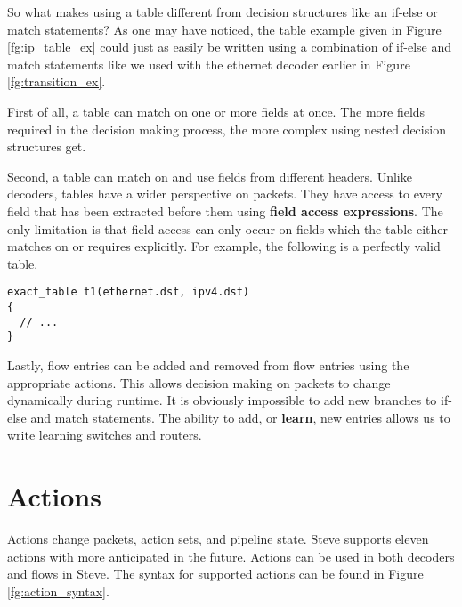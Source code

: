 So what makes using a table different from decision structures like an if-else or match statements? As one may have noticed, the table example given in Figure \ref{fg:ip_table_ex} could just as easily be written using a combination of if-else and match statements like we used with the ethernet decoder earlier in Figure \ref{fg:transition_ex}. 

First of all, a table can match on one or more fields at once. The more fields required in the decision making process, the more complex using nested decision structures get.

Second, a table can match on and use fields from different headers. Unlike decoders, tables have a wider perspective on packets. They have access to every field that has been extracted before them using \textbf{field access expressions}. The only limitation is that field access can only occur on fields which the table either matches on or requires explicitly. For example, the following is a perfectly valid table.

\begin{lstlisting}
exact_table t1(ethernet.dst, ipv4.dst)
{
  // ...
}
\end{lstlisting}

Lastly, flow entries can be added and removed from flow entries using the appropriate actions. This allows decision making on packets to change dynamically during runtime. It is obviously impossible to add new branches to if-else and match statements. The ability to add, or \textbf{learn}, new entries allows us to write learning switches and routers.

\section{Actions} \label{action_tut}

Actions change packets, action sets, and pipeline state. Steve supports eleven actions with more anticipated in the future. Actions can be used in both decoders and flows in Steve. The syntax for supported actions can be found in Figure \ref{fg:action_syntax}.

